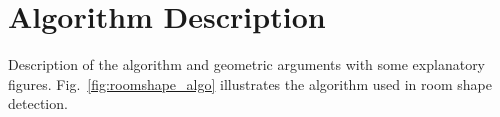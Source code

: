 \section{Algorithm Description}\label{sec:algo}

Description of the algorithm and geometric arguments with some explanatory figures. Fig.~\ref{fig:roomshape_algo} illustrates the algorithm used in room shape detection.

\begin{figure}[h!t]
\end{figure}

